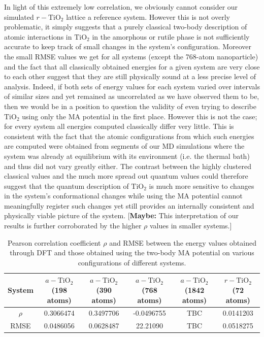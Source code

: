 \documentclass[aps,prb,twocolumn,amsmath,amssymb,superscriptaddress,longbibliography]{revtex4-1}
\begin{document}
In light of this extremely low correlation, we obviously cannot consider our simulated $r-\text{TiO}_2$ lattice a reference system. 
However this is not overly problematic, it simply suggests that a purely classical two-body description of atomic interactions in $\text{TiO}_2$ in the amorphous or rutile phase is not sufficiently accurate to keep track of small changes in the system's configuration.
Moreover the small RMSE values we get for all systems (except the 768-atom nanoparticle) and the fact that all classically obtained energies for a given system are very close to each other suggest that they are still physically sound at a less precise level of analysis.
Indeed, if both sets of energy values for each system varied over intervals of similar sizes and yet remained as uncorrelated as we have observed them to be, then we would be in a position to question the validity of even trying to describe $\text{TiO}_2$ using only the MA potential in the first place.
However this is not the case; for every system all energies computed classically differ very little.
This is consistent with the fact that the atomic configurations from which such energies are computed were obtained from segments of our MD simulations where the system was already at equilibrium with its environment (i.e. the thermal bath) and thus did not vary greatly either.
The contrast between the highly clustered classical values and the much more spread out quantum values could therefore suggest that the quantum description of $\text{TiO}_2$ is much more sensitive to changes in the system's conformational changes while using the MA potential cannot meaningfully register such changes yet still provides an internally consistent and physically viable picture of the system.
[\textbf{Maybe: } This interpretation of our results is further corroborated by the higher $\rho$ values in smaller systems.] 

\begin{table}[]
\begin{tabular}{c|c|c|c|c|c}
System & $a-\text{TiO}_2$ (198 atoms) & $a-\text{TiO}_2$ (390 atoms) & $a-\text{TiO}_2$ (768 atoms) & $a-\text{TiO}_2$ (1842 atoms) & $r-\text{TiO}_2$ (72 atoms) \\ \hline
$\rho$ & 0.3066474                    & 0.3497706                    & -0.0496755                   & TBC                           & 0.0141203                   \\
RMSE   & 0.0486056                    & 0.0628487                    & 22.21090                     & TBC                           & 0.0518275                   \\
\end{tabular}
\label{stats}
\caption{Pearson correlation coefficient $\rho$ and RMSE between the energy values obtained through DFT and those obtained using the two-body MA potential on various configurations of different systems.}
\end{table}
\end{document}
